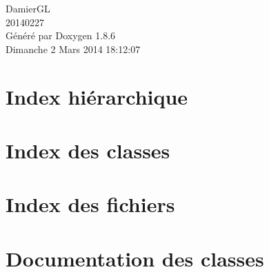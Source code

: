 \documentclass[twoside]{book}
\newcommand{\clearemptydoublepage}{%
  \newpage{\pagestyle{empty}\cleardoublepage}%
}
\begin{document}
\hypersetup{pageanchor=false}
\begin{titlepage}
\vspace*{7cm}
\begin{center}%
{\Large Damier\-G\-L \\[1ex]\large 20140227 }\\
\vspace*{1cm}
{\large Généré par Doxygen 1.8.6}\\
\vspace*{0.5cm}
{\small Dimanche 2 Mars 2014 18:12:07}\\
\end{center}
\end{titlepage}
\clearemptydoublepage
\tableofcontents
\clearemptydoublepage
{}
\hypersetup{pageanchor=true}

\chapter{Index hiérarchique}

\chapter{Index des classes}

\chapter{Index des fichiers}

\chapter{Documentation des classes}


























\end{document}
